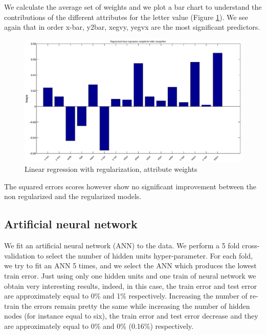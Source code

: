 We calculate the average set of weights and we plot a bar chart to understand the contributions of the different attributes for the letter value (Figure \ref{fig:r6}). We see again that in order x-bar, y2bar, xegvy, yegvx are the most significant predictors. 

\begin{figure}[htbp]
\center
\includegraphics[width = 1.25\textwidth]{figures/r6}
\caption{Linear regression with regularization, attribute weights}
\label{fig:r6}
\end{figure}

The squared errors scores however show no significant improvement between the non regularized and the regularized models.

\subsection{Artificial neural network}
We fit an artificial neural network (ANN) to the data. We perform a 5 fold cross-validation to select the number of hidden units hyper-parameter. For each fold, we try to fit an ANN 5 times, and we select the ANN which produces the lowest train error.
Just using only one hidden units and one train of neural network we obtain very interesting results, indeed, in this case, the train error and test error are approximately equal to 0\% and 1\% respectively. Increasing the number of re-train the errors remain pretty the same while increasing the number of hidden nodes (for instance equal to six), the train error and test error decrease and they are approximately equal to 0\% and 0\% (0.16\%) respectively.

